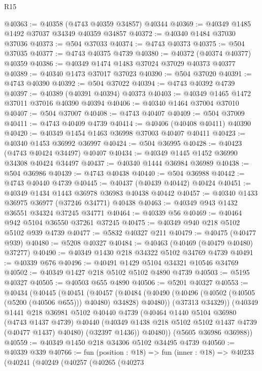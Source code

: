 \begin{lexlean}{R15}
\begin{coremodule}
{{{{{{{{{{{@40363 := @40358 (@4743 @40359 @34857) @40344
@40369 := @40349 @1485 @1492 @37037 @34349 @40359 @34857
@40372 := @40340 @1484 @37030 @37036
@40373 := @504 @37033
@40374 := @4743 @40373
@40375 := @504 @37035
@40377 := @4743 @40375 @4739
@40380 := @40372 (@40374 @40377) @40359
@40386 := @40349 @1474 @1483 @37024 @37029 @40373 @40377
@40389 := @40340 @1473 @37017 @37023
@40390 := @504 @37020
@40391 := @4743 @40390
@40392 := @504 @37022
@40394 := @4743 @40392 @4739
@40397 := @40389 (@40391 @40394) @40373
@40403 := @40349 @1465 @1472 @37011 @37016 @40390 @40394
@40406 := @40340 @1464 @37004 @37010
@40407 := @504 @37007
@40408 := @4743 @40407
@40409 := @504 @37009
@40411 := @4743 @40409 @4739
@40414 := @40406 (@40408 @40411) @40390
@40420 := @40349 @1454 @1463 @36998 @37003 @40407 @40411
@40423 := @40340 @1453 @36992 @36997
@40424 := @504 @36995
@40428 := @40423 (@4743 @40424 @34497) @40407
@40434 := @40349 @1445 @1452 @36990 @34308 @40424 @34497
@40437 := @40340 @1444 @36984 @36989
@40438 := @504 @36986
@40439 := @4743 @40438
@40440 := @504 @36988
@40442 := @4743 @40440 @4739
@40445 := @40437 (@40439 @40442) @40424
@40451 := @40349 @1434 @1443 @36978 @36983 @40438 @40442
@40457 := @40340 @1433 @36975 @36977 (@37246 @34771) @40438
@40463 := @40349 @943 @1432 @36551 @34324 @37245 @34771
@40464 := @40339 @56
@40469 := @40464 @942 @5104 @36550 @37261 @37245
@40475 := @40349 @940 @218 @5102 @5102 @939 @4739
@40477 := @5832 @40327 @211
@40479 := @40475 (@40477 @939)
@40480 := @5208 @40327
@40484 := @40463 (@40469 (@40479 @40480) @37277)
@40490 := @40349 @1430 @218 @34322 @5102 @34769 @4739
@40491 := @40339 @676
@40496 := @40491 @1429 @5104 @34321 @10546 @34769
@40502 := @40349 @1427 @218 @5102 @5102 @4890 @4739
@40503 := @5195 @40327
@40505 := @40503 @655 @4890
@40506 := @5201 @40327
@40553 := @40434
    (@40445
      (@40451
        (@40457
          (@40484 (@40490 (@40496 (@40502 (@40505 (@5200 (@40506 @655))) @40480) @34828) @40480))
          (@37313 @34329))
        (@40349
          @1441
          @218
          @36981
          @5102
          @40440
          @4739
          (@40464
            @1440
            @5104
            @36980
            (@4743 @1437 @4739)
            @40440
            (@40349 @1438 @218 @5102 @5102 @1437 @4739 (@40477 @1437) @40480)
            (@32397 @1436))
          @40480))
      (@5605 @36986 @36988))
@40559 := @40349 @1450 @218 @34306 @5102 @34495 @4739
@40560 := @40339 @339
@40766 := fun (position : @18) =>
  fun (inner : @18) =>
  @40233
    (@40241
      (@40249
        (@40257
          (@40265
            (@40273
}}}}}}}}}}}
\end{coremodule}
\end{lexlean}

